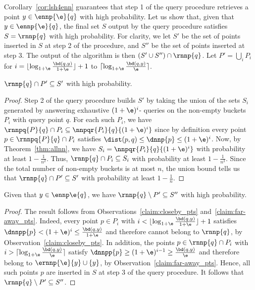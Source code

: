 Corollary~\ref{cor:lsh4enn} guarantees that step 1 of the query
procedure retrieves a point $y\in\ennp{\e}{q}$ with high
probability. Let us show that, given that $y\in \ennp{\e}{q}$, the
final set $S$ output by the query procedure satisfies $S=\rnnp{q}$ with high
probability.  For clarity, we let $S'$ be the set of points inserted
in $S$ at step 2 of the procedure, and $S''$ be the set of points
inserted at step 3. The output of the algorithm is then $(S'\cup
S'')\cap \rnnp{q}$.
Let $P'=\bigcup_i P_i$ for $i=\lfloor \log_{1+\e}
\frac{\bd(q,y)}{1+\e}\rfloor + 1$ to $\lceil 
\log_{1+\e}\frac{\bd(q,y)}{\e}\rceil$.
\begin{lem} \label{lem:allnnred}
  $\rnnp{q}\cap P'\subseteq S'$ with high probability.
\end{lem}
\begin{proof}
  Step 2 of the query procedure builds $S'$ by taking the union of the
  sets $S_i$ generated by answering exhaustive $(1+\e)^{i}$-\pleb
  queries on the non-empty buckets $P_i$ with query point $q$. For
  each such $P_i$, we have $\rnnpq{P}{q}\cap P_i\subseteq
  \nnpqr{P_i}{q}{(1+ \e)^i}$ since by definition every point $p\in
  \rnnpq{P}{q}\cap P_i$ satisfies $\dist(p,q)\leq \dnnp{p}\leq
  (1+\e)^i$. Now, by Theorem~\ref{thm:allnn}, we have $S_i =
  \nnpqr{P_i}{q}{(1+\e)^i}$ with probability at least
  $1-\frac{1}{n^2}$.  Thus, $\rnnp{q}\cap P_i \subseteq S_i$ with
  probability at least $1-\frac{1}{n^2}$. Since the total number of
  non-empty buckets is at most $n$, the union bound tells us that
  $\rnnp{q}\cap P'\subseteq S'$ with probability
  at least $1-\frac{1}{n}$.
\end{proof}
\begin{lem}\label{lem:rnnofann}
  Given that $y\in \ennp\e{q}$, we have $\rnnp{q}\setminus P'\subseteq
  S''$ with high probability.
\end{lem}
\begin{proof}
  The result follows from Observations~\ref{claim:closeby_pts}
  and~\ref{claim:far-away_pts}. Indeed, every point $p\in P_i$ with
  $i< \lfloor \log_{1+\e} \frac{\bd(q,y)}{1+\e}\rfloor+1$ satisfies
  $\dnnpp{p}<(1+\e)^{i}\leq\frac{\bd(q,y)}{1+\e}$ and therefore
  cannot belong to $\rnnp{q}$, by Observation~\ref{claim:closeby_pts}.
  In addition, the points $p\in \rnnp{q}\cap P_i$ with $i>\lceil
  \log_{1+\e}\frac{\bd(q,y)}{\e}\rceil$ satisfy $\dnnpp{p}\geq
  (1+\e)^{i-1}\geq \frac{\bd(q,y)}{\e}$ and therefore belong to
  $\ernnp{\e}{y}\cup\{y\}$, by Observation~\ref{claim:far-away_pts}.
  Hence, all such points $p$ are inserted in $S$ at step 3 of the
  query procedure. It follows that $\rnnp{q}\setminus P'\subseteq
  S''$.
\end{proof}

